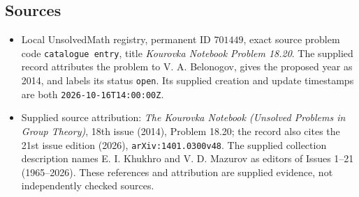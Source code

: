\documentclass[11pt]{article}
\begin{document}
\subsection{Sources}
\begin{itemize}
\item Local UnsolvedMath registry, permanent ID \(701449\), exact source problem code \texttt{catalogue entry}, title \emph{Kourovka Notebook Problem 18.20}. The supplied record attributes the problem to V. A. Belonogov, gives the proposed year as 2014, and labels its status \texttt{open}. Its supplied creation and update timestamps are both \texttt{2026-10-16T14:00:00Z}.
\item Supplied source attribution: \emph{The Kourovka Notebook (Unsolved Problems in Group Theory)}, 18th issue (2014), Problem 18.20; the record also cites the 21st issue edition (2026), \texttt{arXiv:1401.0300v48}. The supplied collection description names E. I. Khukhro and V. D. Mazurov as editors of Issues 1--21 (1965--2026). These references and attribution are supplied evidence, not independently checked sources.
\end{itemize}
\end{document}

